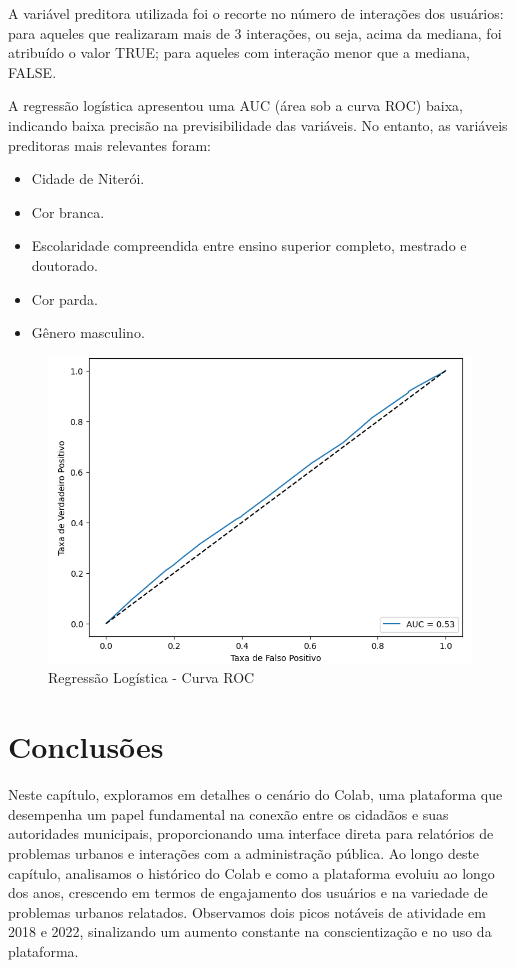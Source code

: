 A variável preditora utilizada foi o recorte no número de interações dos usuários: para aqueles que realizaram mais de 3 interações, ou seja, acima da mediana, foi atribuído o valor TRUE; para aqueles com interação menor que a mediana, FALSE.

A regressão logística apresentou uma AUC (área sob a curva ROC) baixa, indicando baixa precisão na previsibilidade das variáveis. No entanto, as variáveis preditoras mais relevantes foram:

\begin{itemize}
	\item Cidade de Niterói.
	\item Cor branca.
	\item Escolaridade compreendida entre ensino superior completo, mestrado e doutorado.
	\item Cor parda.
	\item Gênero masculino.
\end{itemize}

\begin{figure}[!htb]
	\caption{Regressão Logística - Curva ROC}
	\label{fig:regression_roc}
	\centering
	\includegraphics[scale=0.8]{images/regression_roc.png}
\end{figure}

\section{Conclusões}
Neste capítulo, exploramos em detalhes o cenário do Colab, uma plataforma que desempenha um papel fundamental na conexão entre os cidadãos e suas autoridades municipais, proporcionando uma interface direta para relatórios de problemas urbanos e interações com a administração pública. Ao longo deste capítulo, analisamos o histórico do Colab e como a plataforma evoluiu ao longo dos anos, crescendo em termos de engajamento dos usuários e na variedade de problemas urbanos relatados. Observamos dois picos notáveis de atividade em 2018 e 2022, sinalizando um aumento constante na conscientização e no uso da plataforma.

